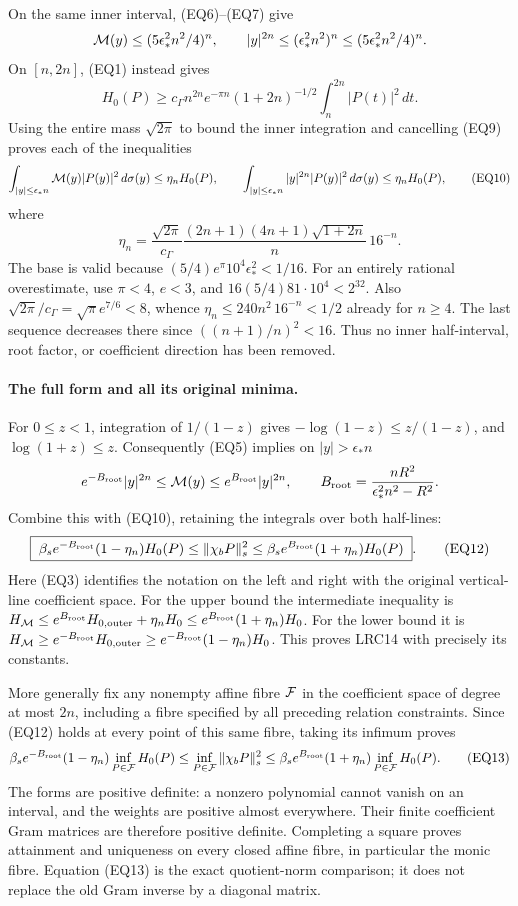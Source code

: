 \documentclass[11pt,a4paper]{article}
\begin{document}
On the same inner interval, (EQ6)--(EQ7) give
\[
 {\cal M}(y)\le(5\epsilon_*^2n^2/4)^n,\qquad
 |y|^{2n}\le(\epsilon_*^2n^2)^n
            \le(5\epsilon_*^2n^2/4)^n .
\]
On \([n,2n]\), (EQ1) instead gives
\[
 H_0(P)\ge
 c_\Gamma n^{2n}e^{-\pi n}(1+2n)^{-1/2}
       \int_n^{2n}|P(t)|^2\,dt .
\tag{EQ9}
\]
Using the entire mass \(\sqrt{2\pi}\) to bound the inner integration
and cancelling (EQ9) proves each of the inequalities
\[
 \int_{|y|\le\epsilon_*n}
       {\cal M}(y)|P(y)|^2\,d\sigma(y)\le\eta_nH_0(P),\qquad
 \int_{|y|\le\epsilon_*n}
       |y|^{2n}|P(y)|^2\,d\sigma(y)\le\eta_nH_0(P),
\tag{EQ10}
\]
where
\[
 \eta_n=\frac{\sqrt{2\pi}}{c_\Gamma}
 \frac{(2n+1)(4n+1)\sqrt{1+2n}}{n}\,16^{-n}.
\tag{EQ11}
\]
The base is valid because
\((5/4)e^\pi10^4\epsilon_*^2<1/16\).
For an entirely rational overestimate, use \(\pi<4\), \(e<3\), and
\(16(5/4)81\cdot10^4<2^{32}\).  Also
\(\sqrt{2\pi}/c_\Gamma=\sqrt\pi e^{7/6}<8\), whence
\(\eta_n\le240n^2\,16^{-n}<1/2\) already for \(n\ge4\).
The last sequence decreases there since \(((n+1)/n)^2<16\).
Thus no inner half-interval, root factor, or coefficient direction has
been removed.

\paragraph{The full form and all its original minima.}
For \(0\le z<1\), integration of \(1/(1-z)\) gives
\(-\log(1-z)\le z/(1-z)\), and \(\log(1+z)\le z\).
Consequently (EQ5) implies on \(|y|>\epsilon_*n\)
\[
 e^{-B_{\rm root}}|y|^{2n}\le{\cal M}(y)
       \le e^{B_{\rm root}}|y|^{2n},\qquad
 B_{\rm root}=\frac{nR^2}{\epsilon_*^2n^2-R^2}.
\]
Combine this with (EQ10), retaining the integrals over both half-lines:
\[
 \boxed{\;
 \beta_s e^{-B_{\rm root}}(1-\eta_n)H_0(P)
 \le \|\chi_bP\|_s^2
 \le \beta_s e^{B_{\rm root}}(1+\eta_n)H_0(P)
 \;}.
\tag{EQ12}
\]
Here (EQ3) identifies the notation on the left and right with the original
vertical-line coefficient space.  For the upper bound the intermediate
inequality is
\(H_{\cal M}\le e^{B_{\rm root}}H_{0,\mathrm{outer}}+\eta_nH_0
\le e^{B_{\rm root}}(1+\eta_n)H_0\).
For the lower bound it is
\(H_{\cal M}\ge e^{-B_{\rm root}}H_{0,\mathrm{outer}}
\ge e^{-B_{\rm root}}(1-\eta_n)H_0\).
This proves LRC14 with precisely its constants.

More generally fix any nonempty affine fibre \({\cal F}\) in the coefficient
space of degree at most \(2n\), including a fibre specified by all preceding
relation constraints.  Since (EQ12) holds at every point of this same
fibre, taking its infimum proves
\[
 \beta_s e^{-B_{\rm root}}(1-\eta_n)
       \inf_{P\in{\cal F}}H_0(P)
 \le\inf_{P\in{\cal F}}\|\chi_bP\|_s^2
 \le\beta_s e^{B_{\rm root}}(1+\eta_n)
       \inf_{P\in{\cal F}}H_0(P).
\tag{EQ13}
\]
The forms are positive definite: a nonzero polynomial cannot vanish on
an interval, and the weights are positive almost everywhere.  Their
finite coefficient Gram matrices are therefore positive definite.
Completing a square proves attainment and uniqueness on every closed
affine fibre, in particular the monic fibre.  Equation (EQ13) is the
exact quotient-norm comparison; it does not replace the old Gram inverse
by a diagonal matrix.
\end{document}
